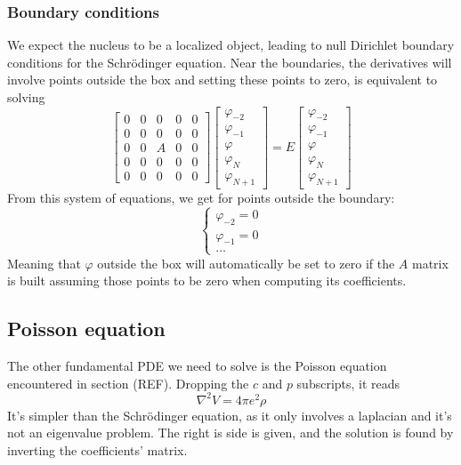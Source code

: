 \subsubsection{Boundary conditions}
We expect the nucleus to be a localized object, leading to null Dirichlet boundary conditions for the Schr\"odinger equation.
Near the boundaries, the derivatives will involve points outside the box and setting these points to zero, is equivalent to solving 
\begin{equation}
    \begin{bmatrix}
        0 & 0 & 0 & 0 & 0
        \\0 & 0 & 0 & 0 & 0
        \\0 & 0 & A & 0 & 0
        \\0 & 0 & 0 & 0 & 0
        \\0 & 0 & 0 & 0 & 0
    \end{bmatrix}
    \begin{bmatrix}
        \varphi_{-2}\\\varphi_{-1}\\\varphi\\\varphi_{N}\\ \varphi_{N+1} 
    \end{bmatrix}
    = E 
    \begin{bmatrix}
        \varphi_{-2}\\\varphi_{-1}\\\varphi\\\varphi_{N}\\ \varphi_{N+1} 
    \end{bmatrix}
\end{equation}
From this system of equations, we get for points outside the boundary:
\begin{equation}
    \begin{cases}
        \varphi_{-2} = 0\\
        \varphi_{-1} = 0\\
        \ldots
    \end{cases}
\end{equation}
Meaning that $\varphi$ outside the box will automatically be set to zero if the $A$ matrix is built assuming those points to be zero when computing its coefficients.
\subsection{Poisson equation}
\label{subsec:poisson}
The other fundamental PDE we need to solve is the Poisson equation encountered in section (REF). Dropping the $c$ and $p$ subscripts, it reads
\begin{equation*}
\nabla^2 V = 4\pi e^2 \rho
\end{equation*}
It's simpler than the Schr\"odinger equation, as it only involves a laplacian and it's not an eigenvalue problem. The right is side is given, and the solution is found by inverting the coefficients' matrix.
